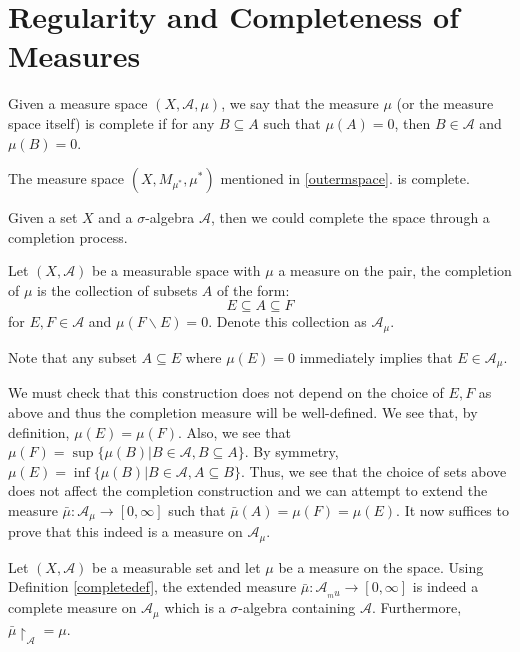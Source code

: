 \documentclass[main.tex]{subfiles}
\begin{document}
\section{Regularity and Completeness of Measures}

\begin{definition}
Given a measure space $(X,\mathcal{A},\mu)$, we say that the measure $\mu$ (or the measure space itself) is complete if for any $B \subseteq A$ such that $\mu(A) = 0$, then $B \in \mathcal{A}$ and $\mu(B) = 0$.
\end{definition}

\begin{example}
The measure space $(X,M_{\mu^*},\mu^*)$ mentioned in \ref{outermspace}. is complete.
\end{example}

Given a set $X$ and a $\sigma$-algebra $\mathcal{A}$, then we could complete the space through a completion process.

\begin{definition}
\label{completedef}
 Let $(X,\mathcal{A})$ be a measurable space with $\mu$ a measure on the pair, the completion of $\mu$ is the collection of subsets $A$ of the form:
 $$ E \subseteq A \subseteq F $$ for $E,F \in \mathcal{A}$ and $\mu(F\backslash E) = 0$. Denote this collection as $\mathcal{A}_{\mu}$.
\end{definition}

\begin{remark}
 Note that any subset $A \subseteq E$ where $\mu(E) = 0$ immediately implies that $E \in \mathcal{A}_{\mu}$.
\end{remark}

We must check that this construction does not depend on the choice of $E,F$ as above and thus the completion measure will be well-defined. We see that, by definition, $\mu(E) = \mu(F)$. Also, we see that $\mu(F) = \sup \{ \mu(B) \vert B \in \mathcal{A}, B \subseteq A \}$. By symmetry, $\mu(E) = \inf\{\mu(B) \vert B \in \mathcal{A}, A \subseteq B\}$. Thus, we see that the choice of sets above does not affect the completion construction and we can attempt to extend the measure $\bar{\mu}: \mathcal{A}_{\mu} \rightarrow [0,\infty]$ such that $\bar{\mu}(A) = \mu(F) = \mu(E)$. It now suffices to prove that this indeed is a measure on $\mathcal{A}_{\mu}$.

\begin{theorem}
\label{completiontheorem}
 Let $(X,\mathcal{A})$ be a measurable set and let $\mu$ be a measure on the space. Using Definition \ref{completedef}, the extended measure $\bar{\mu}:\mathcal{A}_{_mu} \rightarrow [0,\infty]$ is indeed a complete measure on $\mathcal{A}_{\mu}$ which is a $\sigma$-algebra containing $\mathcal{A}$. Furthermore, $\bar{\mu} \restriction_{\mathcal{A}} = \mu$.
\end{theorem}
\end{document}
